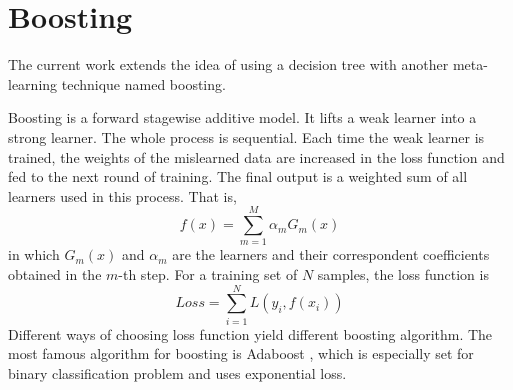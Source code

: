\documentclass{edm_template}
\begin{document}


\section{Boosting}

The current work extends the idea of using a decision tree with another meta-learning technique named boosting.

Boosting\cite{schapire2012boosting} is a forward stagewise additive model\cite{murphy2012machine}. It lifts a weak learner into a strong learner. The whole process is sequential. Each time the weak learner is trained, the weights of the mislearned data are increased in the loss function and fed to the next round of training. The final output is a weighted sum of all learners used in this process. That is,
$$ f(x)=\sum\limits_{m=1}^M\alpha_mG_m(x)$$
in which $G_m(x)$ and $\alpha_m$  are the learners and their correspondent coefficients obtained in the $m$-th step. For a training set of $N$ samples, the loss function is
$$ Loss=\sum\limits_{i=1}^NL(y_i,f(x_i))$$
Different ways of choosing loss function yield different boosting algorithm. The most famous algorithm for boosting is Adaboost \cite{freund1997decision}, which is especially set for binary classification problem and uses exponential loss. 
\end{document}

